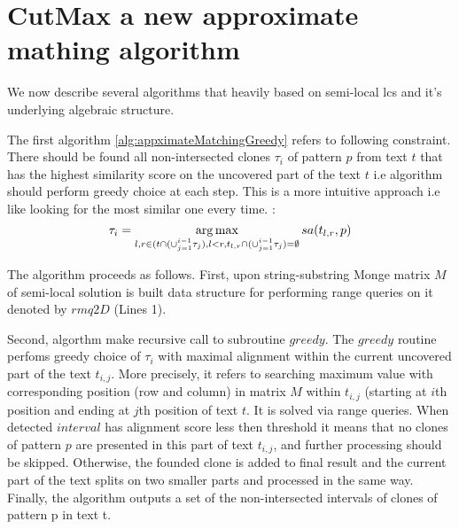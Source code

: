 \section{CutMax a new approximate mathing algorithm}
\label{section:our}
We now describe several algorithms that heavily based on semi-local lcs and it's underlying algebraic structure.

The first algorithm \ref{alg:appximateMatchingGreedy} refers to following constraint.
There should be found all non-intersected clones $\tau_{i}$ of pattern $p$ from text $t$ that has the highest similarity score on the uncovered part of the text $t$ i.e algorithm should perform greedy choice at each step. 
This is a more intuitive approach i.e like looking for the most similar one every time. 
:
\begin{equation}
   \tau_{i} =  \operatorname*{arg\,max}_{l,r \in (t \cap (\cup_{j=1}^{i-1} \tau_{j}),l<r, t_{l,r}  \cap (\cup_{j=1}^{i-1} \tau_{j}) = \emptyset } sa(t_{l,r}, p)
\end{equation}

The algorithm proceeds as follows.
First, upon string-substring Monge matrix $M$ of semi-local solution is built data structure for performing range queries on it denoted by $rmq2D$ (Lines 1).

Second, algorthm make recursive call to subroutine $greedy$.
The $greedy$ routine perfoms greedy choice of $\tau_{i}$  with maximal alignment within the current uncovered part of the text $t_{i,j}$.
More precisely, it refers to searching maximum value with corresponding position (row and column) in matrix $M$ within  $t_{i,j}$ (starting at $i$th position and ending at $j$th position of text $t$.
It is solved via range queries.
When detected $interval$ has alignment score less then threshold it means that no clones of pattern $p$ are presented in this part of text $t_{i,j}$, and further processing should be skipped.
Otherwise, the founded clone is added to final result and the current part of the text splits on two smaller parts and processed in the same way.
Finally, the algorithm outputs a set of the non-intersected intervals of clones of pattern p in text t.


